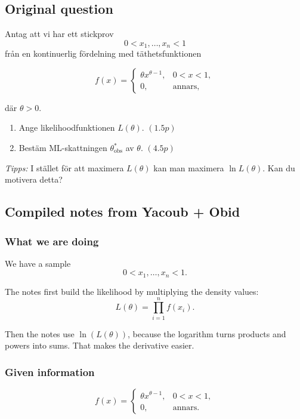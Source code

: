 \documentclass[10pt]{article}
\begin{document}
\subsection*{Original question}

Antag att vi har ett stickprov
\[
0<x_1,\ldots,x_n<1
\]
från en kontinuerlig fördelning med täthetsfunktionen

\[
f(x)=
\begin{cases}
\theta x^{\theta-1},
& 0<x<1,\\
0,
& \text{annars},
\end{cases}
\]

där \(\theta>0\).

\begin{enumerate}[label=\alph*)]
\item Ange likelihoodfunktionen \(L(\theta)\).
\hfill \((1.5p)\)

\item Bestäm ML-skattningen
\(\theta^*_{\text{obs}}\) av \(\theta\).
\hfill \((4.5p)\)
\end{enumerate}

\textit{Tipps:} I stället för att maximera
\(L(\theta)\) kan man maximera \(\ln L(\theta)\).
Kan du motivera detta?

\subsection*{Compiled notes from Yacoub + Obid}

\subsubsection*{What we are doing}

We have a sample
\[
0<x_1,\ldots,x_n<1.
\]

The notes first build the likelihood by multiplying
the density values:
\[
L(\theta)=\prod_{i=1}^{n} f(x_i).
\]

Then the notes use \(\ln(L(\theta))\), because the
logarithm turns products and powers into sums.
That makes the derivative easier.

\subsubsection*{Given information}

\[
f(x)=
\begin{cases}
\theta x^{\theta-1},
& 0<x<1,\\
0,
& \text{annars}.
\end{cases}
\]
\end{document}

